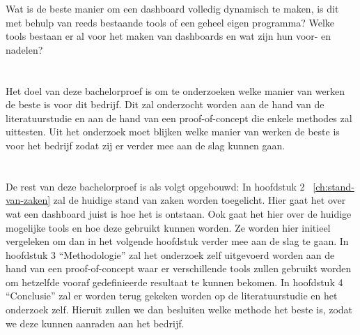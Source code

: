 Wat is de beste manier om een dashboard volledig dynamisch te maken, is dit met behulp van reeds bestaande tools of een geheel eigen programma? 
Welke tools bestaan er al voor het maken van dashboards en wat zijn hun voor- en nadelen?


\section{}%
\label{sec:onderzoeksdoelstelling}

Het doel van deze bachelorproef is om te onderzoeken welke manier van werken de beste is voor dit bedrijf. Dit zal onderzocht worden aan de hand van de literatuurstudie en aan de hand van een proof-of-concept die enkele methodes zal uittesten. Uit het onderzoek moet blijken welke manier van werken de beste is voor het bedrijf zodat zij er verder mee aan de slag kunnen gaan.
\section{}%
\label{sec:opzet-bachelorproef}

De rest van deze bachelorproef is als volgt opgebouwd:
In hoofdstuk 2 ~\ref{ch:stand-van-zaken} zal de huidige stand van zaken worden toegelicht. Hier gaat het over wat een dashboard juist is hoe het is ontstaan. Ook gaat het hier over de huidige mogelijke tools en hoe deze gebruikt kunnen worden. Ze worden hier initieel vergeleken om dan in het volgende hoofdstuk verder mee aan de slag te gaan.
In hoofdstuk 3 “Methodologie” zal het onderzoek zelf uitgevoerd worden aan de hand van een proof-of-concept waar er verschillende tools zullen gebruikt worden om hetzelfde vooraf gedefinieerde resultaat te kunnen bekomen. 
In hoofdstuk 4 “Conclusie” zal er worden terug gekeken worden op de literatuurstudie en het onderzoek zelf. Hieruit zullen we dan besluiten welke methode het beste is, zodat we deze kunnen aanraden aan het bedrijf.
